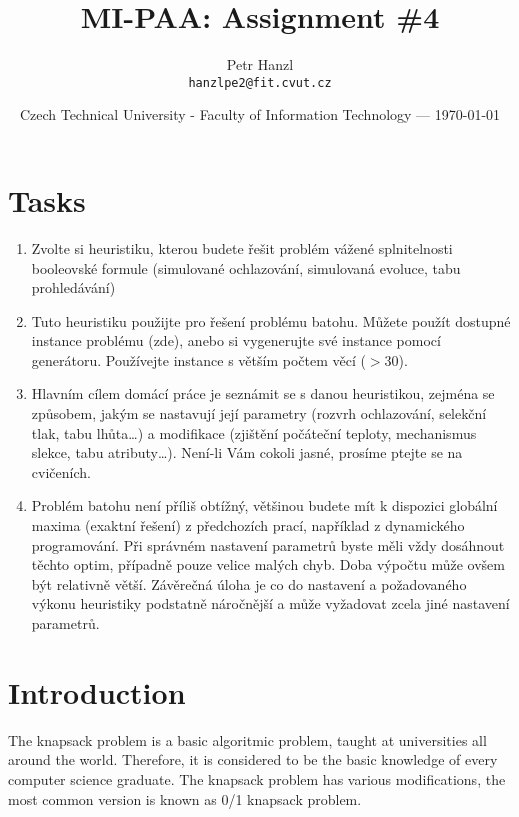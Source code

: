 \documentclass{article}
\title{MI-PAA: Assignment \#4} %
\author{Petr Hanzl\\ \texttt{hanzlpe2@fit.cvut.cz}} %
\date{Czech Technical University - Faculty of Information Technology --- \today} %
\begin{document}
\maketitle %

\section*{Tasks}
	\begin{enumerate}
		\item Zvolte si heuristiku, kterou budete řešit problém vážené splnitelnosti booleovské formule (simulované ochlazování, simulovaná evoluce, tabu prohledávání)
		\item Tuto heuristiku použijte pro řešení problému batohu. Můžete použít dostupné instance problému (zde), anebo si vygenerujte své instance pomocí generátoru. Používejte instance s větším počtem věcí ($>30$).
		\item Hlavním cílem domácí práce je seznámit se s danou heuristikou, zejména se způsobem, jakým se nastavují její parametry (rozvrh ochlazování, selekční tlak, tabu lhůta\dots) a modifikace (zjištění počáteční teploty, mechanismus slekce, tabu atributy\dots). Není-li Vám cokoli jasné, prosíme ptejte se na cvičeních.
		\item Problém batohu není příliš obtížný, většinou budete mít k dispozici globální maxima (exaktní řešení) z předchozích prací, například z dynamického programování. Při správném nastavení parametrů byste měli vždy dosáhnout těchto optim, případně pouze velice malých chyb. Doba výpočtu může ovšem být relativně větší. Závěrečná úloha je co do nastavení a požadovaného výkonu heuristiky podstatně náročnější a může vyžadovat zcela jiné nastavení parametrů.
	\end{enumerate}

\hrulefill
\section*{Introduction} %

The knapsack problem is a basic algoritmic problem, taught at universities all around the world. Therefore, it is considered to be the basic knowledge of every computer science graduate. The knapsack problem has various modifications, the most common version is known as 0/1 knapsack problem.
\end{document}
